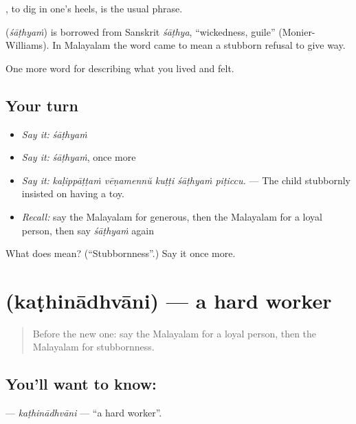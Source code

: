  , to dig in one's heels, is the usual phrase.

\begin{cousinweb}
\textbf{} (\emph{śāṭhyaṁ}) is borrowed from Sanskrit \emph{śāṭhya}, \textquotedblleft{}wickedness, guile\textquotedblright{} (Monier-Williams). In Malayalam the word came to mean a stubborn refusal to give way.
\end{cousinweb}

\begin{grammarlens}[title={What you've built}]
One more word for describing what you lived and felt.
\end{grammarlens}

\subsection*{Your turn}
\begin{itemize}
\raggedright
  \item \emph{Say it:} \emph{śāṭhyaṁ}
  \item \emph{Say it:} \emph{śāṭhyaṁ}, once more
  \item \emph{Say it:} \emph{kaḷippāṭṭaṁ vēṇamennŭ kuṭṭi śāṭhyaṁ piṭiccu.} — The child stubbornly insisted on having a toy.
  \item \emph{Recall:} say the Malayalam for generous, then the Malayalam for a loyal person, then say \emph{śāṭhyaṁ} again
\end{itemize}

\begin{tcolorbox}[breakable,colback=teal!4,colframe=teal!35!black,title={Before you move on}]
What does  mean? (\textquotedblleft{}Stubbornness\textquotedblright{}.) Say it once more.
\end{tcolorbox}
\section[\texorpdfstring{\ml{കഠിനാധ്വാനി} (kaṭhinādhvāni)}{കഠിനാധ്വാനി (kaṭhinādhvāni)}]{ (kaṭhinādhvāni) — a hard worker}

\label{lesson:ML-C528-kathinadhvani}



\begin{quote}
Before the new one: say the Malayalam for a loyal person, then the Malayalam for stubbornness.
\end{quote}

\subsection*{You'll want to know: }
\textbf{} — \emph{kaṭhinādhvāni} — \textquotedblleft{}a hard worker\textquotedblright{}.

